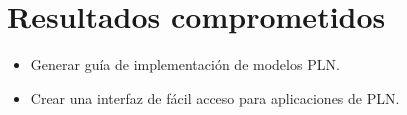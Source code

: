 \section {Resultados comprometidos}
\begin{itemize}
\item Generar guía de implementación de modelos PLN.
\item Crear una interfaz de fácil acceso para aplicaciones de PLN.
\end{itemize}